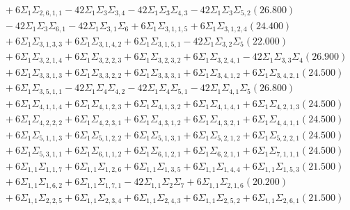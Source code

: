 \documentclass[12pt]{article}
\begin{document}
\begin{landscape}
\begin{align*}
		&\quad\quad +6\Sigma_{1}\Sigma_{2,6,1,1}-42\Sigma_{1}\Sigma_{3}\Sigma_{3,4}-42\Sigma_{1}\Sigma_{3}\Sigma_{4,3}-42\Sigma_{1}\Sigma_{3}\Sigma_{5,2}(26.800) \\ 
		&\quad\quad -42\Sigma_{1}\Sigma_{3}\Sigma_{6,1}-42\Sigma_{1}\Sigma_{3,1}\Sigma_{6}+6\Sigma_{1}\Sigma_{3,1,1,5}+6\Sigma_{1}\Sigma_{3,1,2,4}(24.400) \\ 
		&\quad\quad +6\Sigma_{1}\Sigma_{3,1,3,3}+6\Sigma_{1}\Sigma_{3,1,4,2}+6\Sigma_{1}\Sigma_{3,1,5,1}-42\Sigma_{1}\Sigma_{3,2}\Sigma_{5}(22.000) \\ 
		&\quad\quad +6\Sigma_{1}\Sigma_{3,2,1,4}+6\Sigma_{1}\Sigma_{3,2,2,3}+6\Sigma_{1}\Sigma_{3,2,3,2}+6\Sigma_{1}\Sigma_{3,2,4,1}-42\Sigma_{1}\Sigma_{3,3}\Sigma_{4}(26.900) \\ 
		&\quad\quad +6\Sigma_{1}\Sigma_{3,3,1,3}+6\Sigma_{1}\Sigma_{3,3,2,2}+6\Sigma_{1}\Sigma_{3,3,3,1}+6\Sigma_{1}\Sigma_{3,4,1,2}+6\Sigma_{1}\Sigma_{3,4,2,1}(24.500) \\ 
		&\quad\quad +6\Sigma_{1}\Sigma_{3,5,1,1}-42\Sigma_{1}\Sigma_{4}\Sigma_{4,2}-42\Sigma_{1}\Sigma_{4}\Sigma_{5,1}-42\Sigma_{1}\Sigma_{4,1}\Sigma_{5}(26.800) \\ 
		&\quad\quad +6\Sigma_{1}\Sigma_{4,1,1,4}+6\Sigma_{1}\Sigma_{4,1,2,3}+6\Sigma_{1}\Sigma_{4,1,3,2}+6\Sigma_{1}\Sigma_{4,1,4,1}+6\Sigma_{1}\Sigma_{4,2,1,3}(24.500) \\ 
		&\quad\quad +6\Sigma_{1}\Sigma_{4,2,2,2}+6\Sigma_{1}\Sigma_{4,2,3,1}+6\Sigma_{1}\Sigma_{4,3,1,2}+6\Sigma_{1}\Sigma_{4,3,2,1}+6\Sigma_{1}\Sigma_{4,4,1,1}(24.500) \\ 
		&\quad\quad +6\Sigma_{1}\Sigma_{5,1,1,3}+6\Sigma_{1}\Sigma_{5,1,2,2}+6\Sigma_{1}\Sigma_{5,1,3,1}+6\Sigma_{1}\Sigma_{5,2,1,2}+6\Sigma_{1}\Sigma_{5,2,2,1}(24.500) \\ 
		&\quad\quad +6\Sigma_{1}\Sigma_{5,3,1,1}+6\Sigma_{1}\Sigma_{6,1,1,2}+6\Sigma_{1}\Sigma_{6,1,2,1}+6\Sigma_{1}\Sigma_{6,2,1,1}+6\Sigma_{1}\Sigma_{7,1,1,1}(24.500) \\ 
		&\quad\quad +6\Sigma_{1,1}\Sigma_{1,1,7}+6\Sigma_{1,1}\Sigma_{1,2,6}+6\Sigma_{1,1}\Sigma_{1,3,5}+6\Sigma_{1,1}\Sigma_{1,4,4}+6\Sigma_{1,1}\Sigma_{1,5,3}(21.500) \\ 
		&\quad\quad +6\Sigma_{1,1}\Sigma_{1,6,2}+6\Sigma_{1,1}\Sigma_{1,7,1}-42\Sigma_{1,1}\Sigma_{2}\Sigma_{7}+6\Sigma_{1,1}\Sigma_{2,1,6}(20.200) \\ 
		&\quad\quad +6\Sigma_{1,1}\Sigma_{2,2,5}+6\Sigma_{1,1}\Sigma_{2,3,4}+6\Sigma_{1,1}\Sigma_{2,4,3}+6\Sigma_{1,1}\Sigma_{2,5,2}+6\Sigma_{1,1}\Sigma_{2,6,1}(21.500) \\ 

\end{align*}
\end{landscape}
\end{document}

